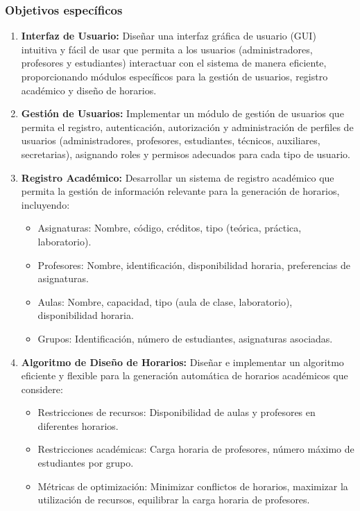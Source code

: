 \documentclass[12pt]{article} %
\begin{document}
    \subsubsection{Objetivos específicos}
    \begin{enumerate}[font=\bfseries] %
        \item \textbf{Interfaz de Usuario:} Diseñar una interfaz gráfica de usuario (GUI) intuitiva y fácil de usar que permita a los usuarios (administradores, profesores y estudiantes) interactuar con el sistema de manera eficiente, proporcionando módulos específicos para la gestión de usuarios, registro académico y diseño de horarios.
        \item \textbf{Gestión de Usuarios:} Implementar un módulo de gestión de usuarios que permita el registro, autenticación, autorización y administración de perfiles de usuarios (administradores, profesores, estudiantes, técnicos, auxiliares, secretarias), asignando roles y permisos adecuados para cada tipo de usuario.
        \item \textbf{Registro Académico:} Desarrollar un sistema de registro académico que permita la gestión de información relevante para la generación de horarios, incluyendo:
        \begin{itemize}
            \item Asignaturas: Nombre, código, créditos, tipo (teórica, práctica, laboratorio).
            \item Profesores: Nombre, identificación, disponibilidad horaria, preferencias de asignaturas.
            \item Aulas: Nombre, capacidad, tipo (aula de clase, laboratorio), disponibilidad horaria.
            \item Grupos: Identificación, número de estudiantes, asignaturas asociadas.
        \end{itemize}
        \item \textbf{Algoritmo de Diseño de Horarios:} Diseñar e implementar un algoritmo eficiente y flexible para la generación automática de horarios académicos que considere:
        \begin{itemize}
            \item Restricciones de recursos: Disponibilidad de aulas y profesores en diferentes horarios.
            \item Restricciones académicas: Carga horaria de profesores, número máximo de estudiantes por grupo.
            \item Métricas de optimización: Minimizar conflictos de horarios, maximizar la utilización de recursos, equilibrar la carga horaria de profesores.

\end{itemize}
\end{enumerate}
\end{document}
